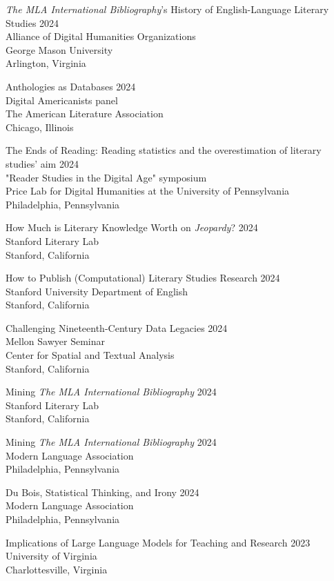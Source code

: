 \documentclass[
  12pt,
  letterpaper,
]{article}
\begin{document}
\emph{The MLA International Bibliography}’s History of English-Language Literary Studies \hfill 2024\\
Alliance of Digital Humanities Organizations\\
George Mason University\\
Arlington, Virginia 

Anthologies as Databases \hfill 2024\\
Digital Americanists panel\\
The American Literature Association\\
Chicago, Illinois

The Ends of Reading: Reading statistics and the overestimation of literary studies' aim \hfill 2024\\
"Reader Studies in the Digital Age" symposium\\
Price Lab for Digital Humanities at the University of Pennsylvania\\
Philadelphia, Pennsylvania

How Much is Literary Knowledge Worth on \emph{Jeopardy}? \hfill 2024\\
Stanford Literary Lab\\
Stanford, California

How to Publish (Computational) Literary Studies Research \hfill 2024\\
Stanford University Department of English\\
Stanford, California

Challenging Nineteenth-Century Data Legacies \hfill 2024\\
Mellon Sawyer Seminar\\
Center for Spatial and Textual Analysis\\
Stanford, California

Mining \emph{The MLA International Bibliography} \hfill 2024\\
Stanford Literary Lab\\
Stanford, California

Mining \emph{The MLA International Bibliography} \hfill 2024\\
Modern Language Association\\
Philadelphia, Pennsylvania

Du Bois, Statistical Thinking, and Irony \hfill 2024\\
Modern Language Association\\
Philadelphia, Pennsylvania

Implications of Large Language Models for Teaching and Research \hfill 2023\\
University of Virginia\\
Charlottesville, Virginia
\end{document}

